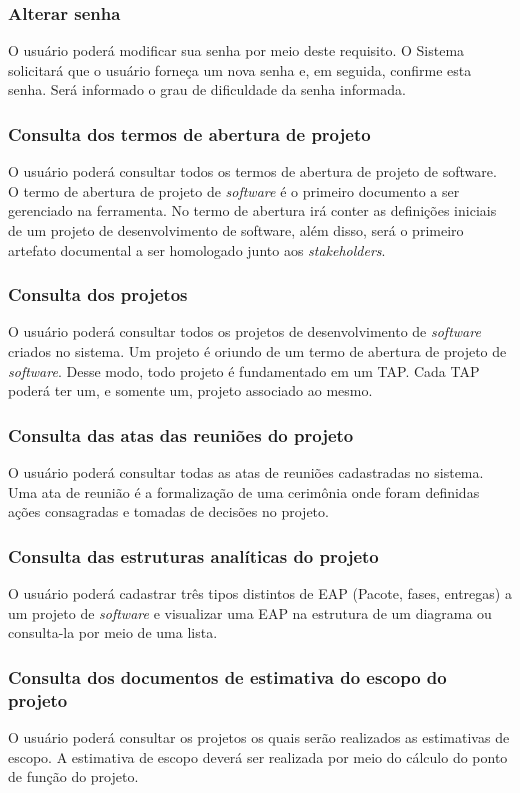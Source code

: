 \documentclass{acm_proc_article-sp}
\begin{document}
\subsubsection{Alterar senha}
O usuário poderá modificar sua senha por meio deste requisito. O Sistema solicitará que o usuário forneça um nova senha e, em seguida, confirme esta senha. Será informado o grau de dificuldade da senha informada.

\subsubsection{Consulta dos termos de abertura de projeto}
O usuário poderá consultar todos os termos de abertura de projeto de software. O termo de abertura de projeto de \textit{software} é o primeiro documento a ser gerenciado na ferramenta. No termo de abertura irá conter as definições iniciais de um projeto de desenvolvimento de software, além disso, será o primeiro artefato documental a ser homologado junto aos \textit{stakeholders}.

\subsubsection{Consulta dos projetos}
O usuário poderá consultar todos os projetos de desenvolvimento de \textit{software} criados no sistema. Um projeto é oriundo de um termo de abertura de projeto de \textit{software}. Desse modo, todo projeto é fundamentado em um TAP. Cada TAP poderá ter um, e somente um, projeto associado ao mesmo.

\subsubsection{Consulta das atas das reuniões do projeto}
O usuário poderá consultar todas as atas de reuniões cadastradas no sistema. Uma ata de reunião é a formalização de uma cerimônia onde foram definidas ações consagradas e tomadas de decisões no projeto.

\subsubsection{Consulta das estruturas analíticas do projeto}
O usuário poderá cadastrar três tipos distintos de EAP (Pacote, fases, entregas) a um projeto de \textit{software} e visualizar uma EAP na estrutura de um diagrama ou consulta-la por meio de uma lista. 

\subsubsection{Consulta dos documentos de estimativa do escopo do projeto}
O usuário poderá consultar os projetos os quais serão realizados as estimativas de escopo. A estimativa de escopo deverá ser realizada por meio do cálculo do ponto de função do projeto.
\end{document}
